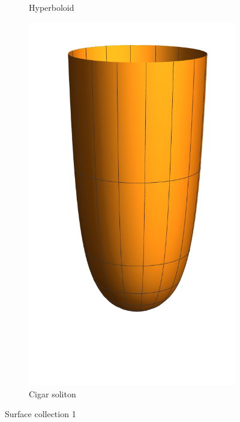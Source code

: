 \begin{figure}[htp]
\begin{subfigure}{0.3\textwidth}
    \caption{Hyperboloid}
\end{subfigure}
\begin{subfigure}{0.2\textwidth}
    \centering
    \includegraphics[width=\textwidth]{picture/week4/cigar.pdf}
    \caption{Cigar soliton}
\end{subfigure}
\caption*{Surface collection 1}
\end{figure}


